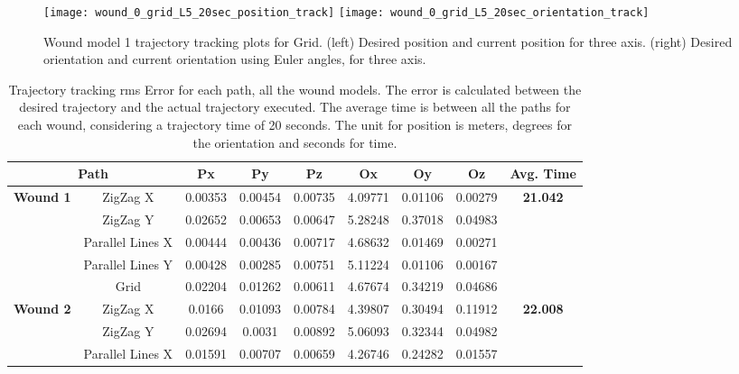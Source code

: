 \begin{figure}[htbp]
	\centering
	\texttt{[image: wound\_0\_grid\_L5\_20sec\_position\_track]}
	\texttt{[image: wound\_0\_grid\_L5\_20sec\_orientation\_track]}
	\caption[Wound model 1 trajectory tracking plots for Grid.]{Wound model 1 trajectory tracking plots for Grid. (left) Desired position and current position for three axis. (right) Desired orientation and current orientation using Euler angles, for three axis.}
    \label{fig:simulation_test_results_trajectory_wound_1_grid}
\end{figure}

\begin{table}[htbp]
    \centering
    \caption[Trajectory tracking root mean square error for each path.]{Trajectory tracking \gls{rms} Error for each path, all the wound models. The error is calculated between the desired trajectory and the actual trajectory executed. The average time is between all the paths for each wound, considering a trajectory time of 20 seconds. The unit for position is meters, degrees for the orientation and seconds for time.}
\begin{adjustbox}{width=1.2\textwidth,center=\textwidth}
    \begin{tabular}{c|c|c|c|c|c|c|c|c}
        \toprule
         \multicolumn{2}{c|}{\textbf{Path}} & \textbf{Px} & \textbf{Py} & \textbf{Pz} & \textbf{Ox} & \textbf{Oy} & \textbf{Oz} & \textbf{Avg. Time} \\
         \midrule
         \multirow{5}{*}{\textbf{Wound 1}} & ZigZag X & 0.00353 & 0.00454 & 0.00735 & 4.09771 & 0.01106 & 0.00279 & \multirow{5}{*}{\textbf{21.042}}\\
         & ZigZag Y & 0.02652 & 0.00653 & 0.00647 & 5.28248 & 0.37018 & 0.04983 & \\
         & Parallel Lines X & 0.00444 & 0.00436 & 0.00717 & 4.68632 & 0.01469 & 0.00271 & \\
         & Parallel Lines Y & 0.00428 & 0.00285 & 0.00751 & 5.11224 & 0.01106 & 0.00167 & \\
         & Grid & 0.02204 & 0.01262 & 0.00611 & 4.67674 & 0.34219 & 0.04686 & \\
         \midrule
         \multirow{5}{*}{\textbf{Wound 2}} & ZigZag X & 0.0166 & 0.01093 & 0.00784 & 4.39807 & 0.30494 & 0.11912 & \multirow{5}{*}{\textbf{22.008}}\\
         & ZigZag Y & 0.02694 & 0.0031 & 0.00892 & 5.06093 & 0.32344 & 0.04982 & \\
         & Parallel Lines X & 0.01591 & 0.00707 & 0.00659 & 4.26746 & 0.24282 & 0.01557 &\\

\end{tabular}
\end{adjustbox}
\end{table}
